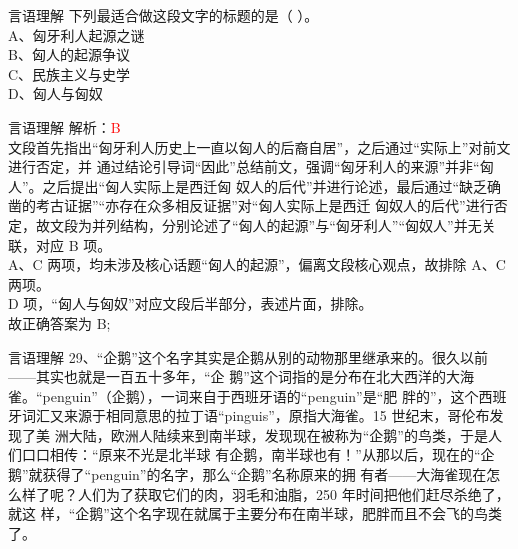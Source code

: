\documentclass[aspectratio=169]{beamer}
\begin{document}
\begin{frame}[t]{言语理解}
    下列最适合做这段文字的标题的是（ ）。\\
    A、匈牙利人起源之谜\\
    B、匈人的起源争议\\
    C、民族主义与史学\\
    D、匈人与匈奴\\

\end{frame}


\begin{frame}[t]{言语理解}
    解析：\textcolor{red}{B}\\
    文段首先指出“匈牙利人历史上一直以匈人的后裔自居”，之后通过“实际上”对前文进行否定，并
    通过结论引导词“因此”总结前文，强调“匈牙利人的来源”并非“匈人”。之后提出“匈人实际上是西迁匈
    奴人的后代”并进行论述，最后通过“缺乏确凿的考古证据”“亦存在众多相反证据”对“匈人实际上是西迁
    匈奴人的后代”进行否定，故文段为并列结构，分别论述了“匈人的起源”与“匈牙利人”“匈奴人”并无关
    联，对应 B 项。\\
    A、C 两项，均未涉及核心话题“匈人的起源”，偏离文段核心观点，故排除 A、C 两项。\\
    D 项，“匈人与匈奴”对应文段后半部分，表述片面，排除。\\
    故正确答案为 B;
\end{frame}





\begin{frame}[t]{言语理解}
    29、“企鹅”这个名字其实是企鹅从别的动物那里继承来的。很久以前——其实也就是一百五十多年，“企
    鹅”这个词指的是分布在北大西洋的大海雀。“penguin”（企鹅），一词来自于西班牙语的“penguin”是“肥
    胖的”，这个西班牙词汇又来源于相同意思的拉丁语“pinguis”，原指大海雀。15 世纪末，哥伦布发现了美
    洲大陆，欧洲人陆续来到南半球，发现现在被称为“企鹅”的鸟类，于是人们口口相传：“原来不光是北半球
    有企鹅，南半球也有！”从那以后，现在的“企鹅”就获得了“penguin”的名字，那么“企鹅”名称原来的拥
    有者——大海雀现在怎么样了呢？人们为了获取它们的肉，羽毛和油脂，250 年时间把他们赶尽杀绝了，就这
    样，“企鹅”这个名字现在就属于主要分布在南半球，肥胖而且不会飞的鸟类了。\\
\end{frame}
\end{document}

